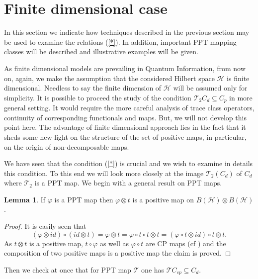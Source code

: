 \documentclass{amsart}
\theoremstyle{plain}
\theoremstyle{definition}
\newtheorem{lem}[thm]{Lemma}
\newcommand{\cH}{\mathcal{H}}
\newcommand{\cT}{\mathcal{T}}
\begin{document}
\section{Finite dimensional case}

In this section we indicate how techniques described in the previous section may be used to examine the relations (\ref{*}). 
In addition, important PPT mapping classes will be described and illustrative examples will be given.

 As  finite dimensional models are prevailing in  Quantum Information, from now on, again,  we make the assumption that the considered Hilbert space $\cH$ is finite dimensional. Needless to say the finite dimension of $\cH$ will be assumed only for simplicity. It is possible to proceed the study of the condition $\cT_2 C_d \subseteq C_p$ in more general setting. It would require the more careful analysis of trace class operators, continuity of corresponding functionals and maps. But, we will not develop this point here. The advantage of finite dimensional approach lies in the fact that it sheds some new light on the structure of the set of positive maps, in particular, on the origin of non-decomposable maps.

We have seen  that the condition (\ref{*}) is crucial and we wish to examine in details this condition.
To this end we will look more closely at the image $\cT_2( C_d)$ of $C_d$ where $\cT_2$ is a PPT map.  
We begin with a general result on PPT maps.
\begin{lem}
\label{lemat1}
If $\varphi$ is a PPT map then $\varphi \otimes t$ is a positive map on $B(\cH) \otimes B(\cH)$.
\end{lem}
\begin{proof}
It is easily seen that
$$(\varphi \otimes id) \circ (id \otimes t) = \varphi \otimes t = \varphi \circ t \circ t \otimes t = (\varphi \circ t \otimes id) \circ t \otimes t.$$
As $t \otimes t$ is a positive map, $t \circ \varphi$ as well as $\varphi \circ t$ are CP maps (cf  \cite{KMP}) and the composition of two positive maps is a positive map the claim is proved.
\end{proof}
Then we check at once that for PPT map $\cT$ one has $\cT C_{cp} \subseteq C_d$.
\end{document}
